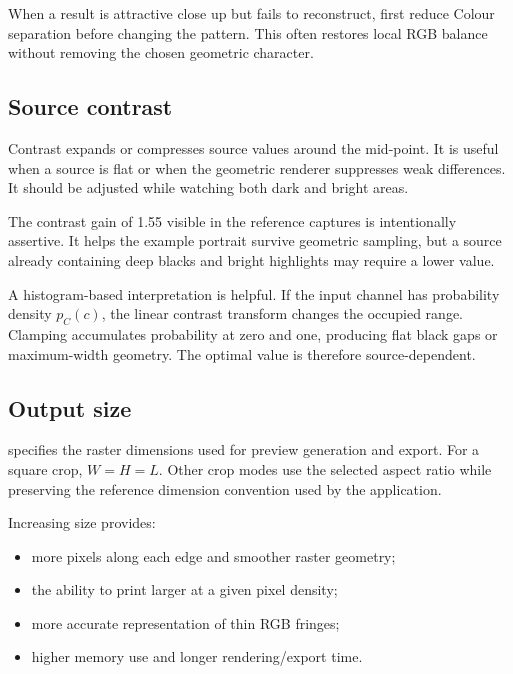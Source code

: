 \begin{tipbox}
When a result is attractive close up but fails to reconstruct, first reduce Colour separation before changing the pattern. This often restores local RGB balance without removing the chosen geometric character.
\end{tipbox}

\subsection{Source contrast}

Contrast expands or compresses source values around the mid-point. It is useful when a source is flat or when the geometric renderer suppresses weak differences. It should be adjusted while watching both dark and bright areas.

The contrast gain of 1.55 visible in the reference captures is intentionally assertive. It helps the example portrait survive geometric sampling, but a source already containing deep blacks and bright highlights may require a lower value.

A histogram-based interpretation is helpful. If the input channel has probability density $p_C(c)$, the linear contrast transform changes the occupied range. Clamping accumulates probability at zero and one, producing flat black gaps or maximum-width geometry. The optimal value is therefore source-dependent.

\subsection{Output size}

 specifies the raster dimensions used for preview generation and export. For a square crop, $W=H=L$. Other crop modes use the selected aspect ratio while preserving the reference dimension convention used by the application.

Increasing size provides:

\begin{itemize}
  \item more pixels along each edge and smoother raster geometry;
  \item the ability to print larger at a given pixel density;
  \item more accurate representation of thin RGB fringes;
  \item higher memory use and longer rendering/export time.
\end{itemize}

